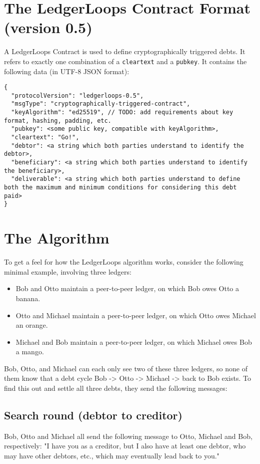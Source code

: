 \documentclass[11pt,twoside,a4paper]{article}
\begin{document}
\section{The LedgerLoops Contract Format (version 0.5)}
A LedgerLoops Contract is used to define cryptographically triggered debts. It refers to exactly one combination of a {\tt cleartext} and a {\tt pubkey}. It contains the following data (in UTF-8 JSON format):

\begin{lstlisting}
{
  "protocolVersion": "ledgerloops-0.5",
  "msgType": "cryptographically-triggered-contract",
  "keyAlgorithm": "ed25519", // TODO: add requirements about key format, hashing, padding, etc.
  "pubkey": <some public key, compatible with keyAlgorithm>,
  "cleartext": "Go!",
  "debtor": <a string which both parties understand to identify the debtor>,
  "beneficiary": <a string which both parties understand to identify the beneficiary>,
  "deliverable": <a string which both parties understand to define both the maximum and minimum conditions for considering this debt paid>
}
\end{lstlisting}

\section{The Algorithm}
To get a feel for how the LedgerLoops algorithm works, consider the following minimal example, involving three ledgers:

\begin{itemize}
\item Bob and Otto maintain a peer-to-peer ledger, on which Bob owes Otto a banana.
\item Otto and Michael maintain a peer-to-peer ledger, on which Otto owes Michael an orange.
\item Michael and Bob maintain a peer-to-peer ledger, on which Michael owes Bob a mango.
\end{itemize}

Bob, Otto, and Michael can each only see two of these three ledgers, so none of them know that a debt cycle
Bob -> Otto -> Michael -> back to Bob exists. To find this out and settle all three debts, they send the
following messages:

\subsection{Search round (debtor to creditor)}
Bob, Otto and Michael all send the following message to Otto, Michael and Bob, respectively:
"I have you as a creditor, but I also have at least one debtor, who may have other debtors, etc.,
which may eventually lead back to you."
\end{document}
